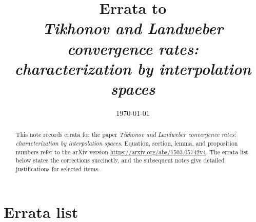 \documentclass[10pt,a4paper]{article}
\begin{document}
\title{Errata to\\
\emph{Tikhonov and Landweber convergence rates:\\ characterization by interpolation spaces}}
\author{}
\date{\today}
\maketitle

\begin{abstract}
This note records errata for the paper \emph{Tikhonov and Landweber convergence rates: characterization by interpolation spaces}.  Equation, section, lemma, and proposition numbers refer to the arXiv version \url{https://arxiv.org/abs/1503.05742v4}.  The errata list below states the corrections succinctly, and the subsequent notes give detailed justifications for selected items.
\end{abstract}

\section*{Errata list}
\end{document}
